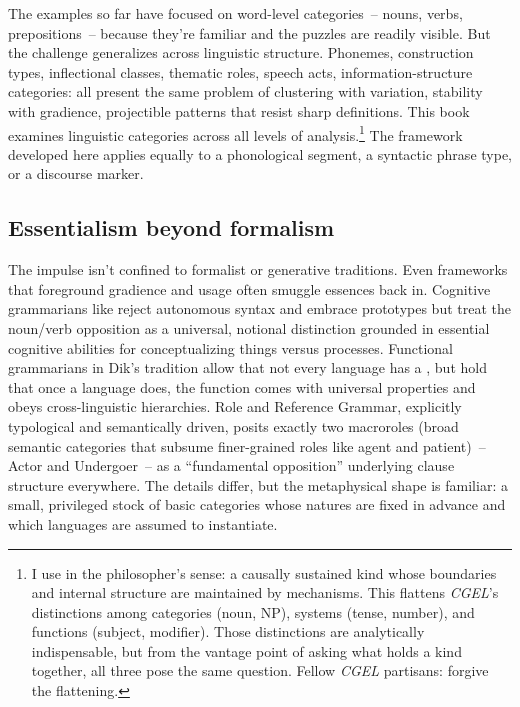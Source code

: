 \noindent The examples so far have focused on word-level categories~-- nouns, verbs, prepositions~-- because they're familiar and the puzzles are readily visible. But the challenge generalizes across linguistic structure. Phonemes, construction types, inflectional classes, thematic roles, speech acts, information-structure categories: all present the same problem of clustering with variation, stability with gradience, projectible patterns that resist sharp definitions. This book examines linguistic categories across all levels of analysis.\footnote{I use  in the philosopher's sense: a causally sustained kind whose boundaries and internal structure are maintained by mechanisms. This flattens \textit{CGEL}'s distinctions among categories (noun, NP), systems (tense, number), and functions (subject, modifier). Those distinctions are analytically indispensable, but from the vantage point of asking what holds a kind together, all three pose the same question. Fellow \textit{CGEL} partisans: forgive the flattening.} The framework developed here applies equally to a phonological segment, a syntactic phrase type, or a discourse marker.

\subsection{Essentialism beyond formalism}
\label{sec:1:essentialism-beyond-formalism}

The impulse isn't confined to formalist or generative traditions. Even frameworks that foreground gradience and usage often smuggle essences back in. Cognitive grammarians like \textcite{langacker1987foundations} reject autonomous syntax and embrace prototypes but treat the noun/verb opposition as a universal, notional distinction grounded in essential cognitive abilities for conceptualizing things versus processes. Functional grammarians in Dik's tradition \citep{dik1997} allow that not every language has a , but hold that once a language does, the function comes with universal properties and obeys cross-linguistic hierarchies. Role and Reference Grammar, explicitly typological and semantically driven, posits exactly two macroroles (broad semantic categories that subsume finer-grained roles like agent and patient)~-- Actor and Undergoer~-- as a \enquote{fundamental opposition} underlying clause structure everywhere. The details differ, but the metaphysical shape is familiar: a small, privileged stock of basic categories whose natures are fixed in advance and which languages are assumed to instantiate.

